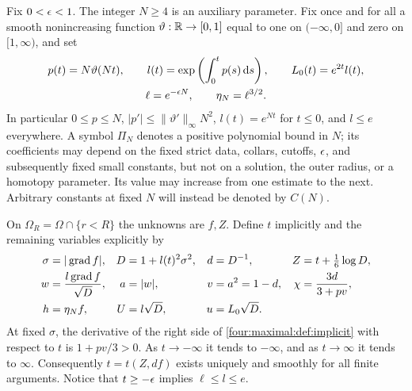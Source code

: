 Fix $0<\epsilon<1$.  The integer $N\ge4$ is an auxiliary parameter.  Fix once
and for all a smooth nonincreasing function $\vartheta:\mathbb R\to[0,1]$ equal
to one on $(-\infty,0]$ and zero on $[1,\infty)$, and set
\begin{equation}\label{four:maximal:def:warp}
 \begin{gathered}
 p(t)=N\vartheta(Nt),\qquad
 l(t)=\exp\left(\int_0^t p(s)\,\mathrm d s\right),\qquad
 L_0(t)=e^{2t}l(t),\\
 \ell=e^{-\epsilon N},\qquad \eta_N=\ell^{3/2}.
 \end{gathered}
\end{equation}
In particular $0\le p\le N$, $|p'|\le\|\vartheta'\|_\infty N^2$,
$l(t)=e^{Nt}$ for $t\le0$,
and $l\le e$ everywhere.  A symbol $\Pi_N$ denotes a positive polynomial
bound in $N$; its coefficients may depend on the fixed strict data,
collars, cutoffs, $\epsilon$, and subsequently fixed small constants, but not
on a solution, the outer radius, or a homotopy parameter.  Its value may
increase from one estimate to the next.  Arbitrary constants at fixed
$N$ will instead be denoted by $C(N)$.

On $\Omega_R=\Omega\cap\{r<R\}$ the unknowns are $f,Z$.  Define $t$
implicitly and the remaining variables explicitly by
\begin{align}
 \sigma&=|\operatorname{grad} f|,& D&=1+l(t)^2\sigma^2,&d&=D^{-1},
 & Z&=t+\tfrac16\log D,\label{four:maximal:def:implicit}\\
 w&=\frac{l\operatorname{grad} f}{\sqrt D},&a&=|w|,&v&=a^2=1-d,
 &\chi&=\frac{3d}{3+pv},\label{four:maximal:def:axial-variables}\\
 h&=\eta_N f,&U&=l\sqrt D,&u&=L_0\sqrt D.
 \label{four:maximal:def:weights}
\end{align}
At fixed $\sigma$, the derivative of the right side of
\eqref{four:maximal:def:implicit} with respect to $t$ is $1+pv/3>0$.  As $t\to-\infty$
it tends to $-\infty$, and as $t\to\infty$ it tends to $\infty$.
Consequently $t=t(Z,df)$ exists uniquely and smoothly for all finite
arguments.  Notice that $t\ge-\epsilon$ implies $\ell\le l\le e$.


